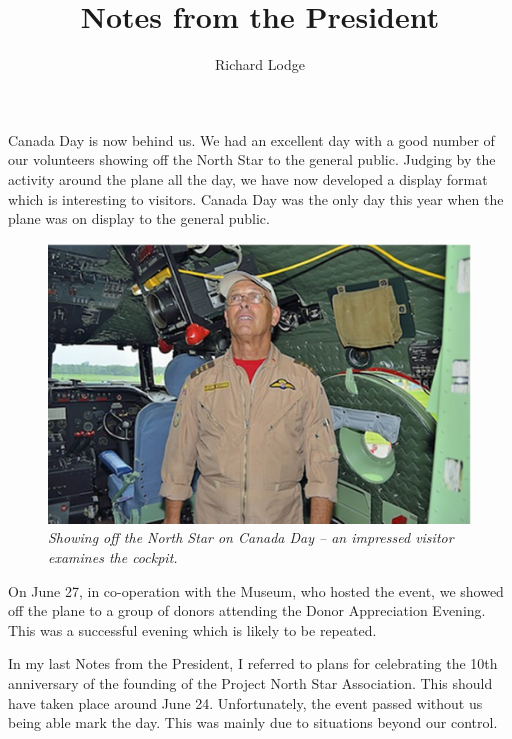 %


\title{Notes from the President}
\author{Richard Lodge}

\maketitle

Canada Day is now behind us.  We had an excellent day with a good
number of our volunteers showing off the North Star to the general
public. Judging by the activity around the plane all the day, we have
now developed a display format which is interesting to visitors.
Canada Day was the only day this year when the plane was on display to
the general public.

\begin{figure}[htbp]
   \vspace{2em}
   \centering
   \includegraphics[scale=0.5]{canadaday_visitor.eps}
   \caption*{\small \em Showing off the North Star on Canada Day -- an
   impressed visitor examines the cockpit.}
   \label{fig:canadaday}
\end{figure}

On June 27, in co-operation with the Museum, who hosted the event, we
showed off the plane to a group of donors attending the Donor
Appreciation Evening.  This was a successful evening which is likely
to be repeated.

In my last Notes from the President, I referred to plans for
celebrating the 10th anniversary of the founding of the Project North
Star Association.  This should have taken place around June 24.
Unfortunately, the event passed without us being able mark the
day. This was mainly due to situations beyond our control.

